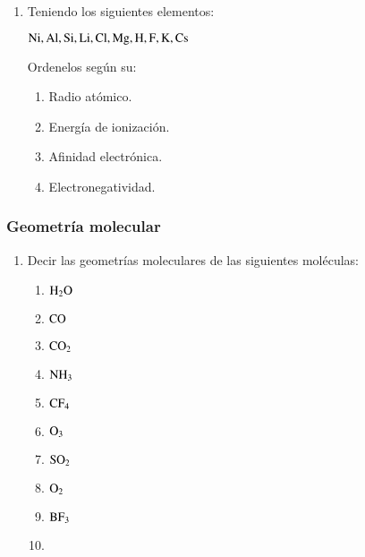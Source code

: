 \begin{enumerate}
    \item Teniendo los siguientes elementos:
    
    \hfil$\ce{Ni, Al, Si, Li, Cl, Mg, H, F, K, Cs}$\hfil

    Ordenelos según su:

    \begin{enumerate}
        \item Radio atómico.
        \item Energía de ionización.
        \item Afinidad electrónica.
        \item Electronegatividad.
    \end{enumerate}
\end{enumerate}


\subsubsection*{Geometría molecular}

\begin{enumerate}
    \item Decir las geometrías moleculares de las siguientes moléculas:
    \begin{multicols}{2}
    \begin{enumerate}
        \item $\ce{H_2O}$
        \item $\ce{CO}$
        \item $\ce{CO_2}$
        \item $\ce{NH_3}$
        \item $\ce{CF_4}$
        \item $\ce{O_3}$
        \item $\ce{SO_2}$
        \item $\ce{O_2}$
        \item $\ce{BF_3}$
        \item[]
    \end{enumerate}
    \end{multicols}
\end{enumerate}
